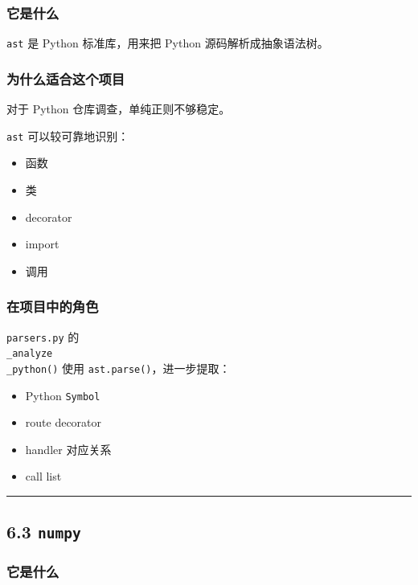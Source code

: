 \documentclass[UTF8,12pt,openany]{ctexbook}
\begin{document}
\subsubsection{它是什么}

\texttt{ast} 是 Python 标准库，用来把 Python 源码解析成抽象语法树。\par

\subsubsection{为什么适合这个项目}

对于 Python 仓库调查，单纯正则不够稳定。  \par
\texttt{ast} 可以较可靠地识别：\par

\begin{itemize}
\item 函数
\item 类
\item decorator
\item import
\item 调用
\end{itemize}

\subsubsection{在项目中的角色}

\texttt{parsers.py} 的 \texttt{\\_analyze\\_python()} 使用 \texttt{ast.parse()}，进一步提取：\par

\begin{itemize}
\item Python \texttt{Symbol}
\item route decorator
\item handler 对应关系
\item call list
\end{itemize}

\hrule

\subsection{6.3 \texttt{numpy}}

\subsubsection{它是什么}
\end{document}
